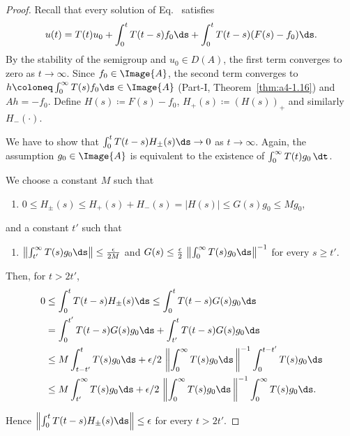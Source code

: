 \begin{proof}
Recall that every solution of Eq.~ satisfies
\begin{equation}\label{eq:c4-1.7}
u(t) = T(t)u_0 + \int_{0}^{t} T(t-s)f_{0} \ds + \int_{0}^{t} T(t-s)(F(s) - f_{0}) \ds.
\end{equation}
By the stability of the semigroup and $u_0 \in D(A)$, the first term converges to zero as $t \to \infty$.
Since $f_{0} \in \Image{A}$, the second term converges to $h \coloneq  \int_{0}^{\infty} T(s)f_{0} \ds \in \Image{A}$ (Part-I, Theorem~\ref{thm:a4-1.16}) and $Ah = -f_{0}$.
Define $H(s) \coloneq F(s) - f_{0}$, 
$ H_{+}(s) \coloneq (H(s))_{+} $ 
and similarly $H_{-}(\cdot)$.

We have to show that $\int_{0}^{t} T(t-s)H_{\pm}(s) \ds \to 0$ as $t \to \infty$.
Again, the assumption $g_{0} \in \Image{A}$ is equivalent to the existence of\/ $\int_{0}^{\infty} T(t)g_{0} \, \dt$.

We choose a constant $M$  such that 
\begin{enumerate}[\upshape (i)]
    \item 
    $0 \leq H_{\pm}(s) \leq H_{+}(s) + H_{-}(s) = |H(s)| \leq G(s)g_{0} \leq Mg_{0}$,
\end{enumerate}
and a constant $t'$ such that
\begin{enumerate}
    \item $ \left\|\int_{t'}^{\infty} T(s)g_{0} \ds\right\| \leq \frac{\epsilon}{2M}$ and  
$G(s) \leq \frac{\epsilon}{2} \,  \left\|\int_{0}^{\infty} T(s)g_{0} \ds\right\|^{-1}$ for every $s \geq t'$.
\end{enumerate}
Then, for $t > 2t'$,
\begin{align*}
	0 &\leq \int_{0}^{t} T(t-s)H_{\pm}(s) \ds \leq \int_{0}^{t} T(t-s)G(s)g_{0} \ds\\
	&= \int_{0}^{t'} T(t-s)G(s)g_{0} \ds + \int_{t'}^{t} T(t-s)G(s)g_{0} \ds\\
	&\leq M \int_{t-t'}^{t} T(s)g_{0} \ds + \epsilon/2 \,  \left\|\int_{0}^{\infty} T(s)g_{0} \ds\, \right\|^{-1} \int_{0}^{t-t'} T(s)g_{0} \ds\\
	&\leq M \int_{t'}^{\infty} T(s)g_{0} \ds + \epsilon/2 \,  \left\|\int_{0}^{\infty} T(s)g_{0} \ds\, \right\|^{-1} \int_{0}^{\infty} T(s)g_{0} \ds.
\end{align*}

Hence $\left\|\int_{0}^{t} T(t-s)H_{\pm}(s) \ds\right\| \leq \epsilon$ for every $t > 2t'$.
\end{proof}
